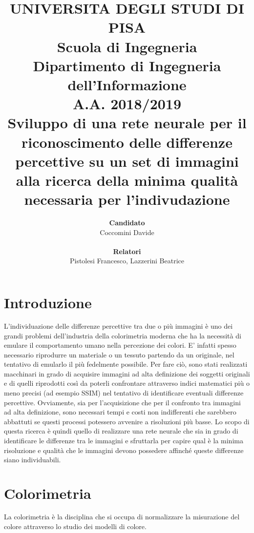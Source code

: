 \documentclass[a4paper,11pt]{article}
\author{
        \textbf{Candidato} \\
        Coccomini Davide \\\\
        \textbf{Relatori}\\
        Pistolesi Francesco, Lazzerini Beatrice \\
    }
\title{\textbf{UNIVERSITA DEGLI STUDI DI PISA} \\[0.4in]
    Scuola di Ingegneria \\
    Dipartimento di Ingegneria dell’Informazione \\
    A.A. 2018/2019\\[0.7in]
    Sviluppo di una rete neurale per il riconoscimento delle differenze percettive su un set di immagini alla ricerca della minima qualità necessaria per l'indivudazione\\[0.5in]}
\date{}
\begin{document}
    \pagestyle{fancy}
    \fancyhead{} 
    \renewcommand{\headrulewidth}{0pt}
    \fancyfoot{}
    \fancyfoot[LE,RO]{\thepage}    
    \renewcommand{\footrulewidth}{0.4pt}
    \maketitle
    \newpage
        \tableofcontents
        \newpage
        \section{Introduzione}
        L'individuazione delle differenze percettive tra due o più immagini è uno dei grandi problemi dell'industria della colorimetria moderna che ha la necessità di emulare il 
        comportamento umano nella percezione dei colori. E' infatti spesso necessario riprodurre un materiale o un tessuto partendo da un originale, nel tentativo di emularlo il più fedelmente possibile. 
        Per fare ciò, sono stati realizzati macchinari in grado di acquisire immagini ad alta definizione dei soggetti originali e di quelli riprodotti così da poterli confrontare attraverso indici matematici più o meno precisi (ad esempio SSIM) 
        nel tentativo di identificare eventuali differenze percettive. Ovviamente, sia per l'acquisizione che per il confronto tra immagini ad alta definizione, sono necessari tempi e costi non indifferenti che sarebbero abbattuti se questi processi potessero avvenire a risoluzioni più basse.
        Lo scopo di questa ricerca è quindi quello di realizzare una rete neurale che sia in grado di identificare le differenze tra le immagini e sfruttarla per capire qual è la minima risoluzione e qualità che le immagini devono possedere affinché queste differenze siano individuabili.
    
        \newpage
        \section{Colorimetria}
        La colorimetria è la disciplina che si occupa di normalizzare la misurazione del colore attraverso lo studio dei modelli di colore.
\end{document}
